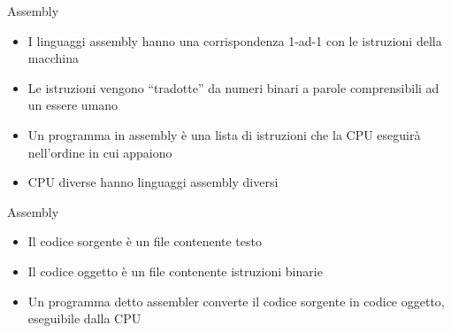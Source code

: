 \begin{frame}{Assembly}
  \vfill
  \begin{itemize}
    \item I linguaggi \alert{assembly} hanno una corrispondenza 1-ad-1
    con le istruzioni della macchina
    \vfill
    \item Le istruzioni vengono ``tradotte'' da numeri binari a parole comprensibili
    ad un essere umano
    \vfill
    \item Un programma in assembly è una lista di istruzioni che la CPU eseguirà
    nell'ordine in cui appaiono
    \vfill
    \item CPU diverse hanno linguaggi assembly diversi
  \end{itemize}
  \vfill
\end{frame}

\begin{frame}{Assembly}
  \vfill
  \begin{center}\end{center}
  \vfill
  \begin{itemize}
    \item Il \alert{codice sorgente} è un file contenente testo
    \vfill
    \item Il \alert{codice oggetto} è un file contenente istruzioni binarie
    \vfill
    \item Un programma detto \alert{assembler} converte il codice sorgente in codice
    oggetto, eseguibile dalla CPU
  \end{itemize}
  \vfill
\end{frame}

